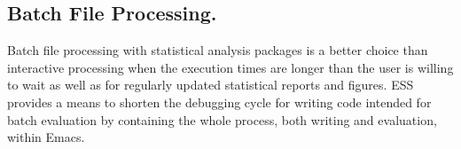 \documentclass{article}
\newcommand*{\SAS}{\textsc{SAS}}
\newcommand{\stexttt}[1]{{\small\texttt{#1}}}
\begin{document}

\subsection{Batch File Processing.}
\label{sec:batch-file}

%
Batch file processing with statistical analysis packages is a better
choice than interactive processing when the execution times are longer
than the user is willing to wait as well as for regularly updated
statistical reports and figures.  ESS provides a means to shorten the
debugging cycle for writing code intended for batch evaluation by
containing the whole process, both writing and evaluation, within
Emacs.
\end{document}
